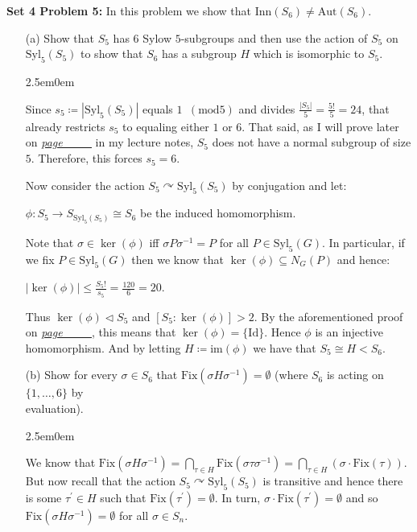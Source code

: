 \documentclass{book}
\newcommand{\inLinkRap}[2]{{\color{blue}\hyperlink{#1}{\textit{#2}}}}
\newcommand{\HexOne}{%
   \color{Purple}%
   \fontsize{12}{13}\selectfont%
}
\newenvironment{myIndent}{%
   \begin{adjustwidth}{2.5em}{0em}%
}{%
   \end{adjustwidth}%
}
\newcommand{\blab}[1]{\textbf{#1}}
\newcommand{\myId}{\mathrm{Id}}
\newcommand{\myIm}{\mathrm{im}}
\newcommand{\Aut}{\mathrm{Aut}}
\newcommand{\mMod}[1]{\phantom{a}(\mathrel{\mathrm{mod}} #1)}
\newcommand{\Fix}{\mathrm{Fix}}
\newcommand{\Syl}{\mathrm{Syl}}
\newcommand{\Inn}{\mathrm{Inn}}
\newcommand{\retTwo}{\hfill\bigbreak}
\begin{document}
\blab{Set 4 Problem 5:} In this problem we show that $\Inn(S_6) \neq \Aut(S_6)$.
\begin{enumerate}
	\item[(a)] Show that $S_5$ has $6$ Sylow $5$-subgroups and then use the action of $S_5$ on $\Syl_5(S_5)$ to show that $S_6$ has a subgroup $H$ which is isomorphic to $S_5$.
	
	\begin{myIndent}\HexOne
		Since $s_5 \coloneqq |\Syl_5(S_5)|$ equals $1 \mMod{5}$ and divides $\frac{|S_5|}{5} = \frac{5!}{5} = 24$, that already restricts $s_5$ to equaling either $1$ or $6$. That said, as I will prove later on \inLinkRap{idk reference 5}{page \_\_\_} in my lecture notes, $S_5$ does not have a normal subgroup of size $5$. Therefore, this forces $s_5 = 6$.\newpage

		Now consider the action $S_5 \curvearrowright \Syl_5(S_5)$ by conjugation and let:
		
		{\centering$\phi : S_5 \to S_{\Syl_5(S_5)} \cong S_6$ be the induced homomorphism.\retTwo\par}
		
		Note that $\sigma \in \ker(\phi)$ iff $\sigma P \sigma^{-1} = P$ for all $P \in \Syl_5(G)$. In particular, if we fix $P \in \Syl_5(G)$ then we know that $\ker(\phi) \subseteq N_G(P)$ and hence:
		
		{\centering$|\ker(\phi)| \leq \frac{S_5!}{s_5} = \frac{120}{6} = 20$.\retTwo\par}

		Thus $\ker(\phi) \lhd S_5$ and $[S_5 : \ker(\phi)] > 2$. By the aforementioned proof on \inLinkRap{idk reference 5}{page \_\_\_}, this means that $\ker(\phi) = \{\myId\}$. Hence $\phi$ is an injective homomorphism. And by letting $H \coloneqq \myIm(\phi)$ we have that $S_5 \cong H < S_6$.\retTwo
	\end{myIndent}

	\item[(b)] Show for every $\sigma \in S_6$ that $\Fix(\sigma H \sigma^{-1}) = \emptyset$ (where $S_6$ is acting on $\{1, \ldots, 6\}$ by\\ evaluation).
	
	\begin{myIndent}\HexOne
		We know that $\Fix(\sigma H \sigma^{-1}) = \bigcap_{\tau \in H}\Fix(\sigma \tau \sigma^{-1}) = \bigcap_{\tau \in H}(\sigma \cdot\Fix(\tau))$. But now recall that the action $S_5 \curvearrowright \Syl_5(S_5)$ is transitive and hence there is some $\tau^\prime \in H$ such that $\Fix(\tau^\prime) = \emptyset$. In turn, $\sigma \cdot \Fix(\tau^\prime) = \emptyset$ and so $\Fix(\sigma H \sigma^{-1}) = \emptyset$ for all $\sigma \in S_n$.


\end{myIndent}
\end{enumerate}
\end{document}
